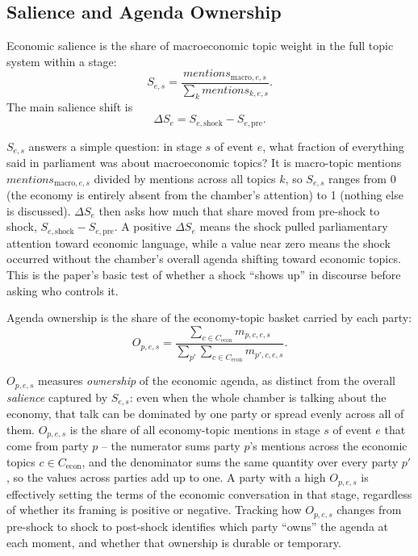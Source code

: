 \documentclass[conference]{IEEEtran}
\begin{document}
\subsection{Salience and Agenda Ownership}
Economic salience is the share of macroeconomic topic weight in the full topic system within a stage:
\begin{equation}
S_{e,s} = \frac{mentions_{\text{macro},e,s}}{\sum_k mentions_{k,e,s}}.
\end{equation}
The main salience shift is
\begin{equation}
\Delta S_e = S_{e,\text{shock}} - S_{e,\text{pre}}.
\end{equation}

$S_{e,s}$ answers a simple question: in stage $s$ of event $e$, what fraction of everything said in parliament was about macroeconomic topics? It is macro-topic mentions $mentions_{\text{macro},e,s}$ divided by mentions across all topics $k$, so $S_{e,s}$ ranges from 0 (the economy is entirely absent from the chamber's attention) to 1 (nothing else is discussed). $\Delta S_e$ then asks how much that share moved from pre-shock to shock, $S_{e,\text{shock}} - S_{e,\text{pre}}$. A positive $\Delta S_e$ means the shock pulled parliamentary attention toward economic language, while a value near zero means the shock occurred without the chamber's overall agenda shifting toward economic topics. This is the paper's basic test of whether a shock ``shows up'' in discourse before asking who controls it.

Agenda ownership is the share of the economy-topic basket carried by each party:
\begin{equation}
O_{p,e,s} =
\frac{\sum_{c \in C_{\text{econ}}} m_{p,c,e,s}}
{\sum_{p'} \sum_{c \in C_{\text{econ}}} m_{p',c,e,s}}.
\end{equation}

$O_{p,e,s}$ measures \emph{ownership} of the economic agenda, as distinct from the overall \emph{salience} captured by $S_{e,s}$: even when the whole chamber is talking about the economy, that talk can be dominated by one party or spread evenly across all of them. $O_{p,e,s}$ is the share of all economy-topic mentions in stage $s$ of event $e$ that come from party $p$ -- the numerator sums party $p$'s mentions across the economic topics $c \in C_{\text{econ}}$, and the denominator sums the same quantity over every party $p'$, so the values across parties add up to one. A party with a high $O_{p,e,s}$ is effectively setting the terms of the economic conversation in that stage, regardless of whether its framing is positive or negative. Tracking how $O_{p,e,s}$ changes from pre-shock to shock to post-shock identifies which party ``owns'' the agenda at each moment, and whether that ownership is durable or temporary.
\end{document}
